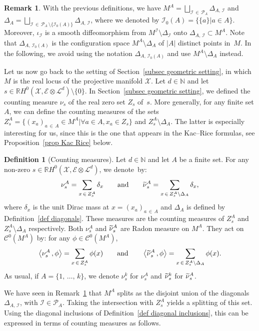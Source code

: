 \documentclass[10pt]{amsart}
\theoremstyle{definition}\newtheorem{defi}[theo]{Definition}\newtheorem{rema}[theo]{Remark}\newtheorem{exam}[theo]{Example}\newtheorem{exem}[theo]{Example}\newtheorem{nota}[theo]{Notation}
\newcommand{\E}{\mathcal{E}}
\newcommand{\I}{\mathcal{I}}
\newcommand{\X}{\mathcal{X}}
\renewcommand{\L}{\mathcal{L}}
\newcommand{\clC}{\mathcal{C}}
\newcommand{\pa}{\mathcal{P}\!}
\newcommand{\N}{\mathbb{N}}
\newcommand{\R}{\mathbb{R}}
\newcommand{\prsc}[2]{\left\langle #1\,, #2 \right\rangle}
\renewcommand{\H}{H^0(\X,\E \otimes \L^d)}
\renewcommand{\tilde}{\widetilde}
\let\oldtilde\tilde
\renewcommand*{\tilde}[1]{\mathchoice{\widetilde{#1}}{\widetilde{#1}}{\oldtilde{#1}}{\oldtilde{#1}}}
\let\oldforall\forall
\renewcommand*{\forall}{\mathrel{\oldforall}}
\begin{document}
\begin{rema}\label{rem diagonal inclusions}
With the previous definitions, we have $M^A = \bigsqcup_{\I\,\in\,\pa_A} \Delta_{A,\,\I}$ and $\Delta_A = \bigsqcup_{\I\,\in\,\pa_A\,\setminus \{\I_0(A)\}} \Delta_{A,\,\I}$, where we denoted by $\I_0(A)= \{ \{a\} \vert a \in A\}$. Moreover, $\iota_\I$ is a smooth diffeomorphism from $M^\I \setminus \Delta_\I$ onto $\Delta_{A,\,\I} \subset M^A$. Note that $\Delta_{A,\,\I_0(A)}$ is the configuration space $M^A \setminus \Delta_A$ of $|A|$ distinct points in~$M$. In the following, we avoid using the notation $\Delta_{A,\,\I_0(A)}$ and use $M^A \setminus \Delta_A$ instead.
\end{rema}

Let us now go back to the setting of Section~\ref{subsec geometric setting}, in which $M$ is the real locus of the projective manifold $\X$. Let $d \in \N$ and let $s \in \R\H \setminus \{0\}$. In Section~\ref{subsec geometric setting}, we defined the counting measure $\nu_s$ of the real zero set $Z_s$ of~$s$. More generally, for any finite set $A$, we can define the counting measures of the sets $Z_s^A = \{(x_a)_{a\,\in \,A} \in M^A \vert \forall a \in A, x_a \in Z_s \}$ and $Z_s^A \setminus \Delta_A$. The latter is especially interesting for us, since this is the one that appears in the Kac--Rice formulas, see Proposition~\ref{prop Kac Rice} below.

\begin{defi}[Counting measures]\label{def nu A}
Let $d \in \N$ and let $A$ be a finite set. For any non-zero $s \in \R\H$, we denote~by:
\[
\nu^A_s = \sum_{x\,\in\,Z_s^A} \delta_x \qquad\text{and}\qquad \tilde{\nu}^A_s = \sum_{x\,\in\,Z_s^A\setminus\Delta_A} \delta_x,
\]where $\delta_x$ is the unit Dirac mass at $x =(x_a)_{a\,\in\,A}$ and $\Delta_A$ is defined by Definition~\ref{def diagonals}. These measures are the counting measures of $Z_s^A$ and $Z_s^A \setminus \Delta_A$ respectively. Both $\nu^A_s$ and $\tilde{\nu}^A_s$ are Radon measure on $M^A$. They act on $\clC^0(M^A)$ by: for any $\phi \in \clC^0(M^A)$,
\[
\prsc{\nu^A_s}{\phi} = \sum_{x\,\in\,Z_s^A} \phi(x) \qquad\text{and} \qquad \prsc{\tilde{\nu}^A_s}{\phi} = \sum_{x\,\in\,Z_s^A\setminus \Delta_A} \phi(x).
\]
As usual, if $A = \{1,\,\dots,\,k\}$, we denote $\nu^k_s$ for $\nu^A_s$ and $\tilde{\nu}^k_s$ for $\tilde{\nu}^A_s$.
\end{defi}

We have seen in Remark~\ref{rem diagonal inclusions} that $M^A$ splits as the disjoint union of the diagonals $\Delta_{A,\,\I}$, with $\I \in \pa_A$. Taking the intersection with $Z_s^A$ yields a splitting of this set. Using the diagonal inclusions of Definition~\ref{def diagonal inclusions}, this can be expressed in terms of counting measures as follows.
\end{document}

